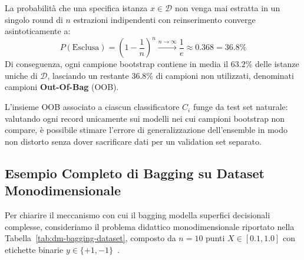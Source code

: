 \begin{theorem}
La probabilità che una specifica istanza $x \in \mathcal{D}$ non venga mai estratta in un singolo round di $n$ estrazioni indipendenti con reinserimento converge asintoticamente a:
\begin{equation}
    P(\text{Esclusa}) = \left(1 - \frac{1}{n}\right)^n \xrightarrow{n \to \infty} \frac{1}{e} \approx 0.368 = 36.8\%
\end{equation}
Di conseguenza, ogni campione bootstrap contiene in media il $63.2\%$ delle istanze uniche di $\mathcal{D}$, lasciando un restante $36.8\%$ di campioni non utilizzati, denominati campioni \textbf{Out-Of-Bag} (OOB).
\end{theorem}

L'insieme OOB associato a ciascun classificatore $C_i$ funge da test set naturale: valutando ogni record unicamente sui modelli nei cui campioni bootstrap non compare, è possibile stimare l'errore di generalizzazione dell'ensemble in modo non distorto senza dover sacrificare dati per un validation set separato.

\FloatBarrier
\subsection{Esempio Completo di Bagging su Dataset Monodimensionale}
\label{subsec:dm-bagging-example}

Per chiarire il meccanismo con cui il bagging modella superfici decisionali complesse, consideriamo il problema didattico monodimensionale riportato nella Tabella~\ref{tab:dm-bagging-dataset}, composto da $n = 10$ punti $X \in [0.1, 1.0]$ con etichette binarie $y \in \{+1, -1\}$~\cite{tan2018}.

\begin{table}[H]
\centering
\caption{Dataset didattico monodimensionale con etichette binarie $y \in \{+1, -1\}$.}
\label{tab:dm-bagging-dataset}
\vspace{2mm}
\end{table}

